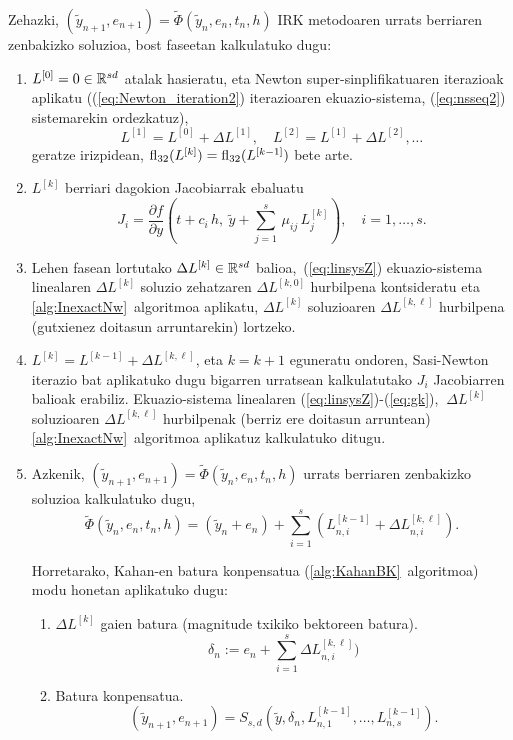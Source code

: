 Zehazki, $(\tilde{y}_{n+1}, e_{n+1})=\tilde{\Phi}(\tilde{y}_n, e_n, t_n, h)$  IRK metodoaren urrats berriaren zenbakizko soluzioa, bost faseetan kalkulatuko dugu:
 \begin{enumerate}
\item
$L^{[0]}=0 \in \mathbb{R}^{sd}$ atalak hasieratu, eta Newton super-sinplifikatuaren iterazioak aplikatu ((\ref{eq:Newton_iteration2}) iterazioaren ekuazio-sistema, (\ref{eq:nsseq2}) sistemarekin ordezkatuz), 
\[
L^{[1]}=L^{[0]} +\Delta L^{[1]}, \quad  L^{[2]}=L^{[1]} +\Delta L^{[2]} , \ldots
\]
geratze irizpidean, $ \mathrm{fl}_{32}(L^{[k]}) = \mathrm{fl}_{32}(L^{[k-1]})$ bete arte.

\item
$L^{[k]}$ berriari dagokion Jacobiarrak ebaluatu 
\begin{equation*}
J_i= \frac{\partial f}{\partial y}\left(t +c_i\,  h,  \ \tilde y+  \sum_{j=1}^{s}\, \mu_{ij}\, L_{j}^{[k]}\right), \quad i=1,\ldots,s.
\end{equation*}
%
\item
Lehen fasean lortutako $\Delta L^{[k]} \in \mathbb{R}^{sd}$ balioa,~(\ref{eq:linsysZ}) ekuazio-sistema linealaren $\Delta L^{[k]}$ soluzio zehatzaren $\Delta L^{[k,0]}$ hurbilpena kontsideratu eta 
\ref{alg:InexactNw}~algoritmoa aplikatu, $\Delta L^{[k]}$ soluzioaren $\Delta L^{[k,\ell]}$ hurbilpena (gutxienez doitasun arruntarekin) lortzeko.

\item 
$L^{[k]} = L^{[k-1]} + \Delta L^{[k,\ell]}$, eta $k=k+1$ eguneratu ondoren, Sasi-Newton iterazio bat aplikatuko dugu bigarren urratsean kalkulatutako $J_i$ Jacobiarren balioak erabiliz. Ekuazio-sistema linealaren (\ref{eq:linsysZ})-(\ref{eq:gk}), $ \ \Delta L^{[k]}$ soluzioaren  $\Delta L^{[k,\ell]}$ hurbilpenak (berriz ere doitasun arruntean)  \ref{alg:InexactNw}~algoritmoa aplikatuz kalkulatuko ditugu.

\item 
Azkenik, $(\tilde{y}_{n+1}, e_{n+1})=\tilde \Phi(\tilde{y}_n, e_n, t_n, h)$  urrats berriaren zenbakizko soluzioa kalkulatuko dugu,
\begin{equation*}
\tilde \Phi(\tilde{y}_n, e_n, t_n, h)=(\tilde y_n + e_n) + \sum_{i=1}^{s}(L_{n,i}^{[k-1]} + \Delta L_{n,i}^{[k,\ell]}).
\end{equation*}

Horretarako, Kahan-en batura konpensatua (\ref{alg:KahanBK}~algoritmoa) modu honetan aplikatuko dugu:
\begin{enumerate}
\item $\Delta L^{[k]}$ gaien batura (magnitude txikiko bektoreen batura).
\begin{equation*}
\delta_n :=  e_n + \sum_{i=1}^{s} \Delta L_{n,i}^{[k,\ell]})
\end{equation*}

\item Batura konpensatua.
\begin{equation*}
(\tilde y_{n+1},e_{n+1}) = S_{s,d}(\tilde y, \delta_n, L_{n,1}^{[k-1]}, \ldots, L_{n,s}^{[k-1]}).
\end{equation*}

\end{enumerate}

\end{enumerate}

